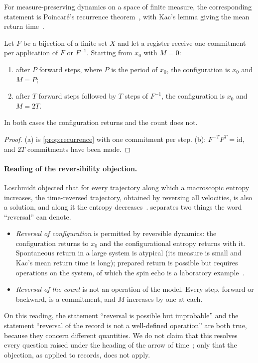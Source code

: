\documentclass[10pt,twocolumn,a4paper]{article}
\begin{document}
For measure-preserving dynamics on a space of finite measure, the
corresponding statement is Poincaré's recurrence theorem~\citep{poincare1890},
with Kac's lemma giving the mean return time~\citep{kac1947}.

\begin{theorem}
\label{thm:loschmidt}
Let $F$ be a bijection of a finite set $X$ and let a register receive one
commitment per application of $F$ or $F^{-1}$. Starting from $x_0$ with
$M=0$:
\begin{enumerate}[label=(\alph*),nosep]
\item after $P$ forward steps, where $P$ is the period of $x_0$, the
      configuration is $x_0$ and $M=P$;
\item after $T$ forward steps followed by $T$ steps of $F^{-1}$, the
      configuration is $x_0$ and $M=2T$.
\end{enumerate}
In both cases the configuration returns and the count does not.
\end{theorem}

\begin{proof}
(a) is \cref{prop:recurrence} with one commitment per step. (b):
$F^{-T}F^{T}=\mathrm{id}$, and $2T$ commitments have been made.
\end{proof}

\paragraph{Reading of the reversibility objection.}
Loschmidt objected that for every trajectory along which a macroscopic
entropy increases, the time-reversed trajectory, obtained by reversing all
velocities, is also a solution, and along it the entropy
decreases~\citep{loschmidt1876}.  separates two things
the word ``reversal'' can denote.
\begin{itemize}[nosep]
\item \emph{Reversal of configuration} is permitted by reversible dynamics:
      the configuration returns to $x_0$ and the configurational entropy
      returns with it. Spontaneous return in a large system is atypical
      (its measure is small and Kac's mean return time is long); prepared
      return is possible but requires operations on the system, of which the
      spin echo is a laboratory example~\citep{hahn1950}.
\item \emph{Reversal of the count} is not an operation of the model. Every
      step, forward or backward, is a commitment, and $M$ increases by one
      at each.
\end{itemize}
On this reading, the statement ``reversal is possible but improbable'' and
the statement ``reversal of the record is not a well-defined operation'' are
both true, because they concern different quantities. We do not claim that
this resolves every question raised under the heading of the arrow of
time~\citep{lebowitz1993,albert2000}; only that the objection, as applied to
records, does not apply.
\end{document}
